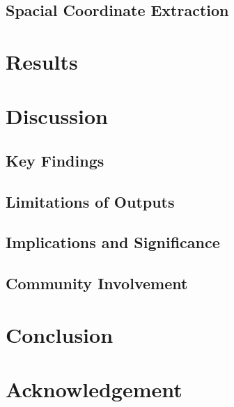 \documentclass[10pt]{article}
\begin{document}
\subsection{Spacial Coordinate Extraction}



\section{Results}



\section{Discussion}

\subsection{Key Findings}

\subsection{Limitations of Outputs}

\subsection{Implications and Significance}

\subsection{Community Involvement}



\section{Conclusion}

\section*{Acknowledgement}

\printbibliography
\end{document}
